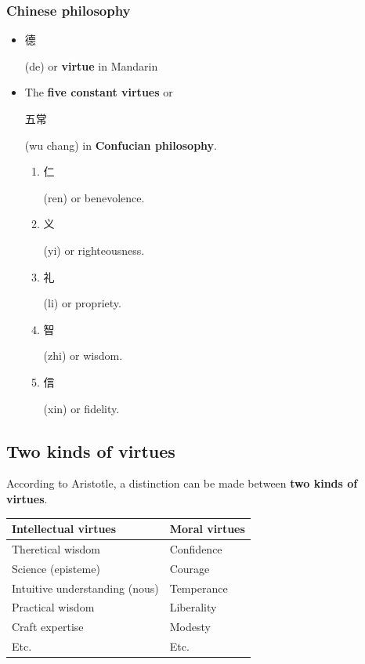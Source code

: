 \documentclass[11pt]{article}
\begin{document}
\subsubsection{Chinese philosophy}
\label{sec:orgb703a1c}
\begin{itemize}
\item \begin{CJK*}{UTF8}{gbsn} 德 \end{CJK*} (de) or \textbf{virtue} in Mandarin
\item The \textbf{five constant virtues} or  \begin{CJK*}{UTF8}{gbsn} 五常 \end{CJK*} (wu chang) in \textbf{Confucian philosophy}.
\begin{enumerate}
\item \begin{CJK*}{UTF8}{gbsn} 仁 \end{CJK*} (ren) or benevolence.
\item \begin{CJK*}{UTF8}{gbsn} 义 \end{CJK*} (yi) or righteousness.
\item \begin{CJK*}{UTF8}{gbsn} 礼 \end{CJK*} (li) or propriety.
\item \begin{CJK*}{UTF8}{gbsn} 智 \end{CJK*} (zhi) or wisdom.
\item \begin{CJK*}{UTF8}{gbsn} 信 \end{CJK*} (xin) or fidelity.
\end{enumerate}
\end{itemize}
\subsection{Two kinds of virtues}
\label{sec:orgb570f15}
According to Aristotle, a distinction can be made between \textbf{two kinds of virtues}.

\begin{center}
\begin{tabularx}{\textwidth}{X|X}
Intellectual virtues & Moral virtues\\
\hline
Theretical wisdom & Confidence\\
Science (episteme) & Courage\\
Intuitive understanding (nous) & Temperance\\
Practical wisdom & Liberality\\
Craft expertise & Modesty\\
Etc. & Etc.\\
\end{tabularx}
\end{center}
\end{document}
